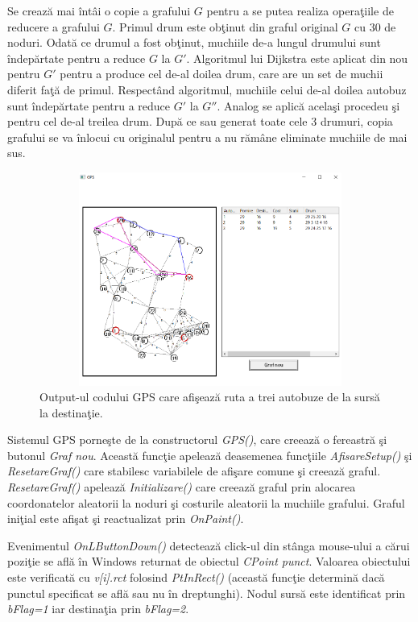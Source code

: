 \documentclass[11pt,a4paper]{report}
\begin{document}
      Se creaz\u a mai \^ int\^ ai o copie a grafului $G$ pentru a se putea realiza opera\c tiile de reducere a grafului $G$. Primul drum este ob\c tinut din graful original $G$ cu 30 de noduri. Odat\u a ce drumul a fost ob\c tinut, muchiile  de-a lungul drumului sunt \^ indep\u artate pentru a reduce $G$ la $G'$. Algoritmul lui Dijkstra este aplicat din nou pentru $G'$ pentru a produce cel de-al doilea drum, care are un set de muchii diferit fa\c t\u a de primul. Respect\^ and algoritmul, muchiile celui de-al doilea autobuz sunt \^ indep\u artate pentru a reduce $G'$ la $G''$. Analog se aplic\u a acela\c si procedeu \c si pentru cel de-al treilea drum. Dup\u a ce sau generat toate cele 3 drumuri, copia grafului se va \^ inlocui cu originalul pentru a nu r\u am\^ ane eliminate muchiile de mai sus.
      
    \begin{figure}[!hbt]
	\centering
	\includegraphics[width=12cm, height=7cm]{MiniGPS.png}
	\caption{Output-ul codului GPS care afi\c seaz\u a ruta a trei autobuze de la surs\u a la destina\c tie.} 
\end{figure} 
		 Sistemul GPS porne\c ste de la constructorul \textit{GPS()}, 
		care creeaz\u a o fereastr\u a \c si butonul \textit{Graf nou}. Aceast\u a func\c tie apeleaz\u a deasemenea func\c tiile 
		\textit{AfisareSetup()} \c si \textit{ResetareGraf()} care stabilesc  variabilele de afi\c sare comune \c si creeaz\u a graful. 
		\textit{ResetareGraf()} apeleaz\u a \textit{Initializare()} care creeaz\u a graful prin alocarea coordonatelor aleatorii la noduri \c si 
		costurile aleatorii la muchiile grafului. Graful ini\c tial este afi\c sat \c si reactualizat prin \textit{OnPaint()}.
		
		Evenimentul \textit{OnLButtonDown()} detecteaz\u a click-ul din st\^ anga mouse-ului a c\u arui pozi\c tie se afl\u a \^ in 
		Windows returnat de obiectul \textit{CPoint punct}. Valoarea obiectului este verificat\u a cu \textit{v[i].rct} folosind 
		\textit{PtInRect()} (aceast\u a func\c tie determin\u a dac\u a punctul specificat se afl\u a sau nu \^ in dreptunghi). Nodul surs\u a este identificat prin \textit{bFlag=1} iar destina\c tia prin \textit{bFlag=2}.
		
\end{document}
